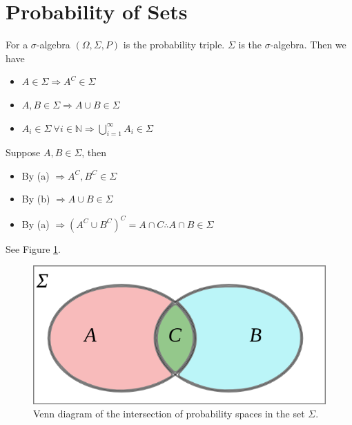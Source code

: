 
\mainmatter
\setcounter{page}{1}

\lectureseries[\course]{\course}

\date{October 6, 2009}

\setaddress

\setcounter{lecture}{2}
\setcounter{chapter}{2}


\section{Probability of Sets}
For a $\sigma$-algebra $(\Omega, \Sigma, P)$ is the probability triple. $\Sigma$ is the $\sigma$-algebra. Then we have
\begin{itemize}
\item $A\in\Sigma \Rightarrow A^C\in\Sigma$
\item $A, B\in\Sigma \Rightarrow A\cup B\in\Sigma$
\item $A_i\in\Sigma ~\forall i\in\mathbb{N} \Rightarrow \bigcup_{i=1}^\infty A_i\in\Sigma$
\end{itemize}
Suppose $A,B\in\Sigma$, then
\begin{itemize}
\item By (a) $\Rightarrow A^C,B^C\in\Sigma$
\item By (b) $\Rightarrow A\cup B\in\Sigma$
\item By (a) $\Rightarrow (A^C\cup B^C)^C = A\cap C \therefore A\cap B\in\Sigma$
\end{itemize}
See Figure \ref{fig:03vennProb}.

\begin{figure}[ht!]
	\centering
	\includegraphics[width=.5\textwidth]{images/03vennProb}
	\caption{Venn diagram of the intersection of probability spaces in the set $\Sigma$.}
	\label{fig:03vennProb}
\end{figure}


